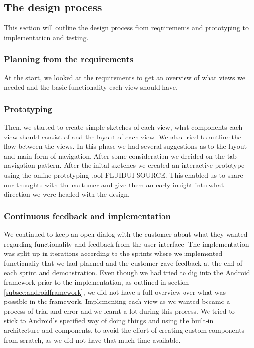 \subsection{The design process}
This section will outline the design process from requirements and prototyping to implementation and testing.

\subsubsection{Planning from the requirements}
At the start, we looked at the requirements to get an overview of what views we needed and the basic functionality each view should have. 

\pagebreak

\subsubsection{Prototyping}
Then, we started to create simple sketches of each view, what components each view should consist of and the layout of each view. We also tried to outline the flow between the views. In this phase we had several suggestions as to the layout and main form of navigation. After some consideration we decided on the tab navigation pattern.
\newline
\newline
After the inital sketches we created an interactive prototype using the online prototyping tool FLUIDUI SOURCE. This enabled us to share our thoughts with the customer and give them an early insight into what direction we were headed with the design.

\subsubsection{Continuous feedback and implementation}
We continued to keep an open dialog with the customer about what they wanted regarding functionality and feedback from the user interface. The implementation was split up in iterations according to the sprints where we implemented functionaliy that we had planned and the customer gave feedback at the end of each sprint and demonstration. 
\newline
\newline
Even though we had tried to dig into the Android framework prior to the implementation, as outlined in section \ref{subsec:androidframework}, we did not have a full overview over what was possible in the framework. Implementing each view as we wanted became a process of trial and error and we learnt a lot during this process. We tried to stick to Android's specified way of doing things and using the built-in architecture and components, to avoid the effort of creating custom components from scratch, as we did not have that much time available. 

